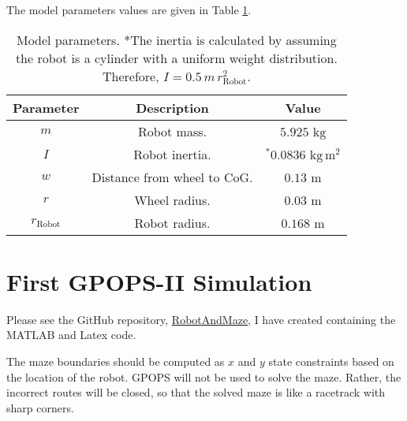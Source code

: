 \documentclass[12pt]{article}
\numberwithin{equation}{section} %
\numberwithin{figure}{section} %
\begin{document}
The model parameters values are given in Table \ref{tab:Model}.
\begin{table}[h!]
	\centering
	\begin{tabular}{c c c}
		\hline
		\textbf{Parameter} & \textbf{Description} & \textbf{Value} \\ \hline
		$m$ & Robot mass. & $5.925$ $\mathrm{kg}$ \\ \hline
		$I$ & Robot inertia. & $^* 0.0836$ $\mathrm{kg \, m^2}$ \\ \hline
		$w$ & Distance from wheel to CoG. & $0.13$ $\mathrm{m}$ \\ \hline
		$r$ & Wheel radius. & $0.03$ $\mathrm{m}$ \\ \hline
		$r_\mathrm{Robot}$ & Robot radius. & $0.168$ $\mathrm{m}$ \\ \hline
	\end{tabular}
	\caption{Model parameters. *The inertia is calculated by assuming the robot is a cylinder with a uniform weight distribution. Therefore, $I = 0.5 \, m \, r_\mathrm{Robot}^2$.}
	\label{tab:Model}
\end{table}

\iffalse
\section{Model Validation}

To test the model, a simulation is run with constant forces, with the right force set higher than the left force. The longitudinal velocity should increase at a constant acceleration, and the robot is expected to run in circles.

Please see the GitHub repository, {\color{blue} \href{https://github.com/CharlvdM/RobotAndMaze}{RobotAndMaze}}, I have created containing the MATLAB and Latex code.
\fi

\section{First GPOPS-II Simulation}

Please see the GitHub repository, {\color{blue} \href{https://github.com/CharlvdM/RobotAndMaze}{RobotAndMaze}}, I have created containing the MATLAB and Latex code.

The maze boundaries should be computed as $x$ and $y$ state constraints based on the location of the robot. GPOPS will not be used to solve the maze. Rather, the incorrect routes will be closed, so that the solved maze is like a racetrack with sharp corners.
\end{document}
